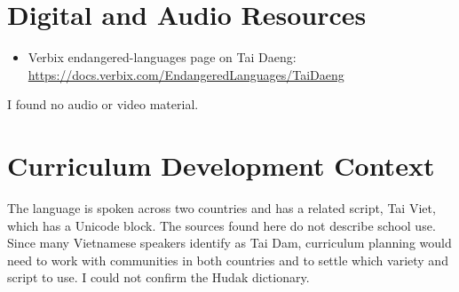 \documentclass[12pt]{article}
\begin{document}
\section{Digital and Audio Resources}
\begin{itemize}
\item Verbix endangered-languages page on Tai Daeng: \url{https://docs.verbix.com/EndangeredLanguages/TaiDaeng}
\end{itemize}
I found no audio or video material.

\section{Curriculum Development Context}
The language is spoken across two countries and has a related script, Tai Viet, which has a Unicode block. The sources found here do not describe school use. Since many Vietnamese speakers identify as Tai Dam, curriculum planning would need to work with communities in both countries and to settle which variety and script to use. I could not confirm the Hudak dictionary.
\end{document}
